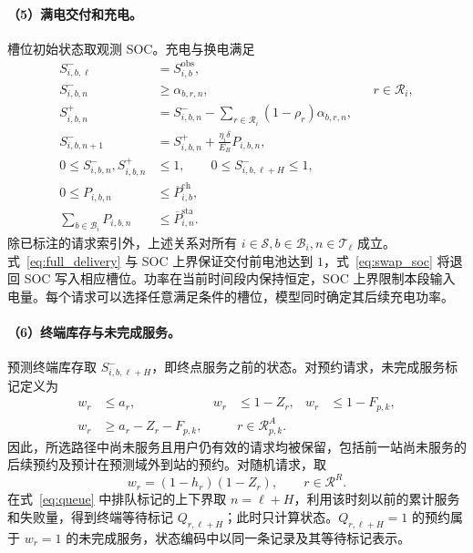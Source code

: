 \documentclass[12pt,a4paper,UTF8]{ctexart}
\numberwithin{equation}{section}
\newcommand{\R}{\mathcal R}
\begin{document}
\paragraph{（5）满电交付和充电。}
槽位初始状态取观测 SOC。充电与换电满足
\begin{subequations}\label{eq:battery_dynamics}
\begin{align}
S_{i,b,\ell}^{-}&=S_{i,b}^{\mathrm{obs}},\label{eq:initial_soc}\\
S_{i,b,n}^{-}&\ge\alpha_{b,r,n},
&&r\in\R_i,\label{eq:full_delivery}\\
S_{i,b,n}^{+}&=S_{i,b,n}^{-}
-\sum_{r\in\R_i}(1-\rho_r)\alpha_{b,r,n},\label{eq:swap_soc}\\
S_{i,b,n+1}^{-}&=S_{i,b,n}^{+}
+\frac{\eta_i\delta}{E_B}P_{i,b,n},\label{eq:charge_soc}\\
0\le S_{i,b,n}^{-},S_{i,b,n}^{+}&\le1,
\qquad 0\le S_{i,b,\ell+H}^{-}\le1,\label{eq:soc_bounds}\\
0\le P_{i,b,n}&\le\overline P_{i,b}^{\mathrm{ch}},\label{eq:device_power}\\
\sum_{b\in\mathcal B_i}P_{i,b,n}&\le\overline P_{i,n}^{\mathrm{sta}}.
\label{eq:station_power}
\end{align}
\end{subequations}
除已标注的请求索引外，上述关系对所有 $i\in\mathcal S,b\in\mathcal B_i,n\in\mathcal T_\ell$ 成立。式~\eqref{eq:full_delivery} 与 SOC 上界保证交付前电池达到 $1$，式~\eqref{eq:swap_soc} 将退回 SOC 写入相应槽位。功率在当前时间段内保持恒定，SOC 上界限制本段输入电量。每个请求可以选择任意满足条件的槽位，模型同时确定其后续充电功率。

\paragraph{（6）终端库存与未完成服务。}
预测终端库存取 $S_{i,b,\ell+H}^{-}$，即终点服务之前的状态。对预约请求，未完成服务标记定义为
\begin{equation}
\begin{aligned}
w_r&\le a_r,&w_r&\le1-Z_r,&w_r&\le1-F_{p,k},\\
w_r&\ge a_r-Z_r-F_{p,k},
&&r\in\R_{p,k}^A.
\end{aligned}
\label{eq:terminal_pending}
\end{equation}
因此，所选路径中尚未服务且用户仍有效的请求均被保留，包括前一站尚未服务的后续预约及预计在预测域外到站的预约。对随机请求，取
\begin{equation}
w_r=(1-h_r)(1-Z_r),\qquad r\in\R^R.
\label{eq:terminal_random}
\end{equation}
在式~\eqref{eq:queue} 中排队标记的上下界取 $n=\ell+H$，利用该时刻以前的累计服务和失败量，得到终端等待标记 $Q_{r,\ell+H}$；此时只计算状态。$Q_{r,\ell+H}=1$ 的预约属于 $w_r=1$ 的未完成服务，状态编码中以同一条记录及其等待标记表示。
\end{document}
